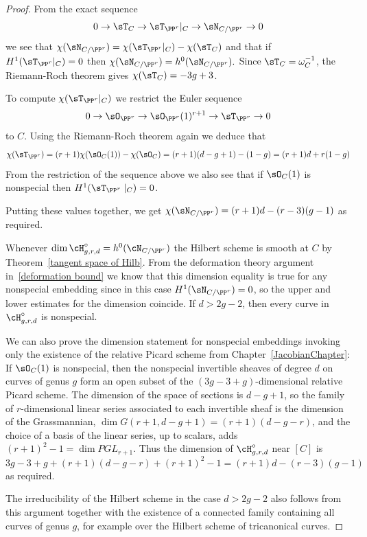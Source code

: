 \begin{proof} 
From the exact sequence
$$
0 \to \sT_C \to \sT_{\PP^r}|_C \to \sN_{C/\PP^r} \to 0
$$
we see that $\chi(\sN_{C/\PP^r}) = \chi(\sT_{\PP^r}|_C) - \chi(\sT_C)$
and that if $H^1( \sT_{\PP^r}|_C) = 0$ then $\chi(\sN_{C/\PP^r}) = h^0(\sN_{C/\PP^r}).$
Since $\sT_C = \omega_C^{-1}$, the Riemann-Roch theorem gives $\chi(\sT_C) = -3g+3$.

To compute $\chi(\sT_{\PP^r}|_C)$ we restrict the Euler sequence
$$
0\to \sO_{\PP^r} \to \sO_{\PP^r}(1)^{r+1} \to \sT_{\PP^r} \to 0
$$
to $C$.
Using the Riemann-Roch theorem again we deduce that
$$
\chi( \sT_{\PP^r} ) = (r+1)\chi(\sO_C(1)) - \chi(\sO_C) = (r+1)(d-g+1) - (1-g) = (r+1)d + r(1-g)
$$
From the restriction of the sequence above we also see that
if $\sO_C(1)$ is nonspecial then $H^1(\sT_{\PP^r}\mid_C) = 0$.

Putting these values together, we get
$
\chi(\sN_{C/\PP^r}) = (r+1)d - (r-3)(g-1)
$
as required.

Whenever $\dim \cH^\circ_{g,r,d} = h^{0}(\cN_{C/\PP^{r}}) $ the Hilbert scheme is smooth at $C$ by
Theorem~\ref{tangent space of Hilb}. 
From the deformation theory argument
in~\ref{deformation bound} we know that this dimension equality is true for any
nonspecial embedding since in this case 
$H^1(\sN_{C/\PP^r}) = 0$, so the upper and lower estimates for the dimension
coincide. If $d>2g-2$, then every curve in $\cH^\circ_{g,r,d}$ is nonspecial.

We can also prove the dimension statement for nonspecial embeddings invoking only the existence of the relative Picard scheme from
Chapter~\ref{JacobianChapter}: 
If $\sO_C(1)$ is nonspecial, then the
nonspecial invertible sheaves of degree $d$ on curves of genus $g$
 form an open subset of the $(3g-3+ g)$-dimensional relative Picard scheme. The dimension
 of the space of sections is $d-g+1$, so the family of $r$-dimensional linear series associated to
 each invertible sheaf is the dimension of the Grassmannian, $\dim G(r+1, d-g+1) = (r+1)(d-g-r)$,
 and the choice of a basis of the linear series, up to scalars, adds $(r+1)^2-1 = \dim PGL_{r+1}$. 
 Thus the dimension of  $\cH^\circ_{g,r,d}$ near $[C]$ is
$$
3g-3+ g + (r+1)(d-g-r) + (r+1)^2-1 = (r+1)d - (r-3)(g-1)
$$
as required. 

The irreducibility of the Hilbert scheme in the case $d>2g-2$ also follows from this argument 
together with the existence of a connected family containing all curves of genus $g$, for example over the
Hilbert scheme of tricanonical curves.
\end{proof}


